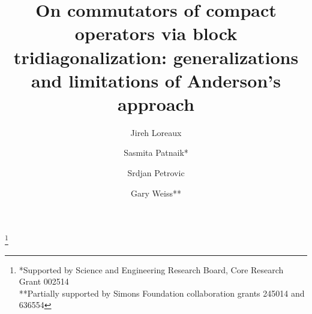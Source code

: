 \documentclass[10pt,reqno]{amsart}
\theoremstyle{remark}
\numberwithin{equation}{section}
\begin{document}
\title[On Commutators of Compact Operators]{On commutators of compact operators via block tridiagonalization: generalizations and limitations of Anderson's approach}


\author{Jireh Loreaux}
\address{J.~Loreaux, Department of Mathematics and Statistics, Southern Illinois University Edwardsville, Edwardsville, IL 62026 (USA)}
\author{Sasmita Patnaik*}
\address{S.~Patnaik, Department of Mathematics and Statistics, Indian Institute of Technology, Kanpur 208016 (INDIA)}
\author{Srdjan Petrovic}
\address{S.~Petrovic, Department of Mathematics, Western Michigan University, Kalamazoo, MI 49008 (USA)}
\author{Gary Weiss**}
\address{G.~Weiss, Department of Mathematics, University of Cincinnati, Cincinnati, OH 45221-0025 (USA)}

\thanks{*Supported by Science and Engineering Research Board, Core Research Grant 002514 \quad\\
  **Partially supported by Simons Foundation collaboration grants 245014 and 636554}

\maketitle
\end{document}
